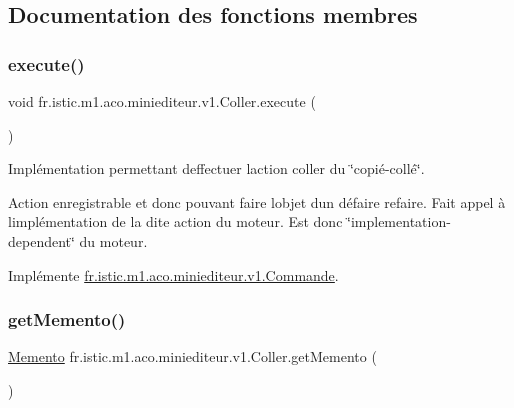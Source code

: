 \subsection{Documentation des fonctions membres}
\mbox{\label{classfr_1_1istic_1_1m1_1_1aco_1_1miniediteur_1_1v1_1_1Coller_a753fef9385eac2cc41d99bf19bd486fe}} 
\subsubsection{\texorpdfstring{execute()}{execute()}}
{\footnotesize\ttfamily void fr.\+istic.\+m1.\+aco.\+miniediteur.\+v1.\+Coller.\+execute (\begin{DoxyParamCaption}{ }\end{DoxyParamCaption})}



Implémentation permettant d\textquotesingle{}effectuer l\textquotesingle{}action coller du \char`\"{}copié-\/collé\char`\"{}. 

Action enregistrable et donc pouvant faire l\textquotesingle{}objet d\textquotesingle{}un défaire refaire. Fait appel à l\textquotesingle{}implémentation de la dite action du moteur. Est donc \char`\"{}implementation-\/dependent\char`\"{} du moteur. 

Implémente \hyperlink{interfacefr_1_1istic_1_1m1_1_1aco_1_1miniediteur_1_1v1_1_1Commande_a87a8a55bac4e81e32339248f79f7de4f}{fr.\+istic.\+m1.\+aco.\+miniediteur.\+v1.\+Commande}.

\mbox{\label{classfr_1_1istic_1_1m1_1_1aco_1_1miniediteur_1_1v1_1_1Coller_a7ec61b1f6fcc322d4a3548e4e1461689}} 
\subsubsection{\texorpdfstring{get\+Memento()}{getMemento()}}
{\footnotesize\ttfamily \hyperlink{interfacefr_1_1istic_1_1m1_1_1aco_1_1miniediteur_1_1v1_1_1Memento}{Memento} fr.\+istic.\+m1.\+aco.\+miniediteur.\+v1.\+Coller.\+get\+Memento (\begin{DoxyParamCaption}{ }\end{DoxyParamCaption})}



